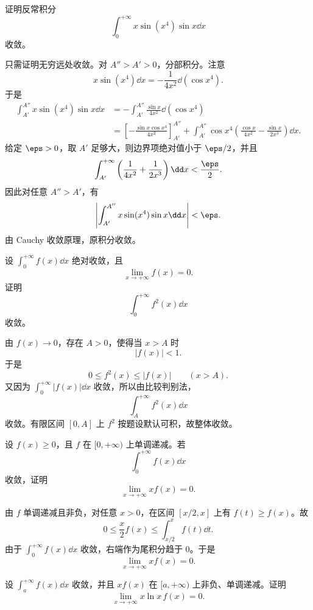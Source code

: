 \begin{problem}
	证明反常积分
	\[
	\int_0^{+\infty}x\sin(x^4)\sin x\dd x
	\]
	收敛。
\end{problem}

\begin{solution}
	只需证明无穷远处收敛。对 $A''>A'>0$，分部积分。注意
	\[
	x\sin(x^4)\dd x=-\frac1{4x^2}\dd(\cos x^4).
	\]
	于是
	\[
	\begin{aligned}
		\int_{A'}^{A''}x\sin(x^4)\sin x\dd x
		&=-\int_{A'}^{A''}\frac{\sin x}{4x^2}\dd(\cos x^4)\\
		&=\left[-\frac{\sin x\cos x^4}{4x^2}\right]_{A'}^{A''}
		+\int_{A'}^{A''}\cos x^4\left(\frac{\cos x}{4x^2}-\frac{\sin x}{2x^3}\right)\dd x.
	\end{aligned}
	\]
	给定 $\eps>0$，取 $A'$ 足够大，则边界项绝对值小于 $\eps/2$，并且
	\[
	\int_{A'}^{+\infty}\left(\frac1{4x^2}+\frac1{2x^3}\right)\dd x<\frac\eps2.
	\]
	因此对任意 $A''>A'$，有
	\[
	\left|\int_{A'}^{A''}x\sin(x^4)\sin x\dd x\right|<\eps.
	\]
	由 Cauchy 收敛原理，原积分收敛。
\end{solution}

\begin{problem}
	设 $\displaystyle\int_0^{+\infty}f(x)\dd x$ 绝对收敛，且
	\[
	\lim_{x\to+\infty}f(x)=0.
	\]
	证明
	\[
	\int_0^{+\infty}f^2(x)\dd x
	\]
	收敛。
\end{problem}

\begin{solution}
	由 $f(x)\to0$，存在 $A>0$，使得当 $x>A$ 时
	\[
	|f(x)|<1.
	\]
	于是
	\[
	0\leq f^2(x)\leq |f(x)|\qquad(x>A).
	\]
	又因为 $\int_0^{+\infty}|f(x)|\dd x$ 收敛，所以由比较判别法，
	\[
	\int_A^{+\infty}f^2(x)\dd x
	\]
	收敛。有限区间 $[0,A]$ 上 $f^2$ 按题设默认可积，故整体收敛。
\end{solution}

\begin{problem}
	设 $f(x)\geq0$，且 $f$ 在 $[0,+\infty)$ 上单调递减。若
	\[
	\int_0^{+\infty}f(x)\dd x
	\]
	收敛，证明
	\[
	\lim_{x\to+\infty}x f(x)=0.
	\]
\end{problem}

\begin{solution}
	由 $f$ 单调递减且非负，对任意 $x>0$，在区间 $[x/2,x]$ 上有 $f(t)\geq f(x)$。故
	\[
	0\leq \frac{x}{2}f(x)\leq \int_{x/2}^{x}f(t)\dd t.
	\]
	由于 $\int_0^{+\infty}f(x)\dd x$ 收敛，右端作为尾积分趋于 $0$。于是
	\[
	\lim_{x\to+\infty}x f(x)=0.
	\]
\end{solution}

\begin{problem}
	设 $\displaystyle\int_a^{+\infty}f(x)\dd x$ 收敛，并且 $xf(x)$ 在 $[a,+\infty)$ 上非负、单调递减。证明
	\[
	\lim_{x\to+\infty}x\ln x\,f(x)=0.
	\]
\end{problem}

